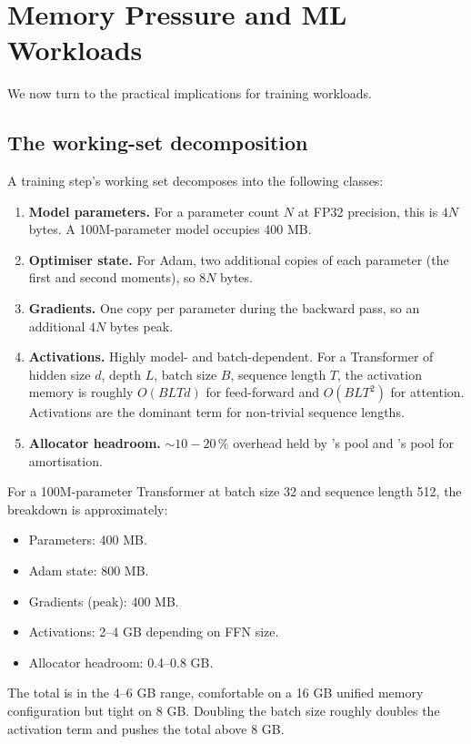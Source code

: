 \section{Memory Pressure and ML Workloads}
\label{sec:unified_memory:ml}

We now turn to the practical implications for training workloads.

\subsection{The working-set decomposition}
\label{ssec:unified_memory:working_set}

A training step's working set decomposes into the following classes:

\begin{enumerate}
  \item \textbf{Model parameters.} For a parameter count \(N\) at
    FP32 precision, this is \(4N\) bytes. A 100M-parameter model
    occupies 400 MB.
  \item \textbf{Optimiser state.} For Adam, two additional copies of
    each parameter (the first and second moments), so \(8N\) bytes.
  \item \textbf{Gradients.} One copy per parameter during the
    backward pass, so an additional \(4N\) bytes peak.
  \item \textbf{Activations.} Highly model- and batch-dependent. For
    a Transformer of hidden size \(d\), depth \(L\), batch size
    \(B\), sequence length \(T\), the activation memory is roughly
    \(O(B L T d)\) for feed-forward and \(O(B L T^2)\) for
    attention. Activations are the dominant term for non-trivial
    sequence lengths.
  \item \textbf{Allocator headroom.} \(\sim 10\!-\!20\,\%\) overhead
    held by \Lucid's pool and \MLX's pool for amortisation.
\end{enumerate}

For a 100M-parameter Transformer at batch size 32 and sequence
length 512, the breakdown is approximately:
\begin{itemize}
  \item Parameters: 400 MB.
  \item Adam state: 800 MB.
  \item Gradients (peak): 400 MB.
  \item Activations: 2--4 GB depending on FFN size.
  \item Allocator headroom: 0.4--0.8 GB.
\end{itemize}
The total is in the 4--6 GB range, comfortable on a 16 GB unified
memory configuration but tight on 8 GB. Doubling the batch size
roughly doubles the activation term and pushes the total above 8 GB.

